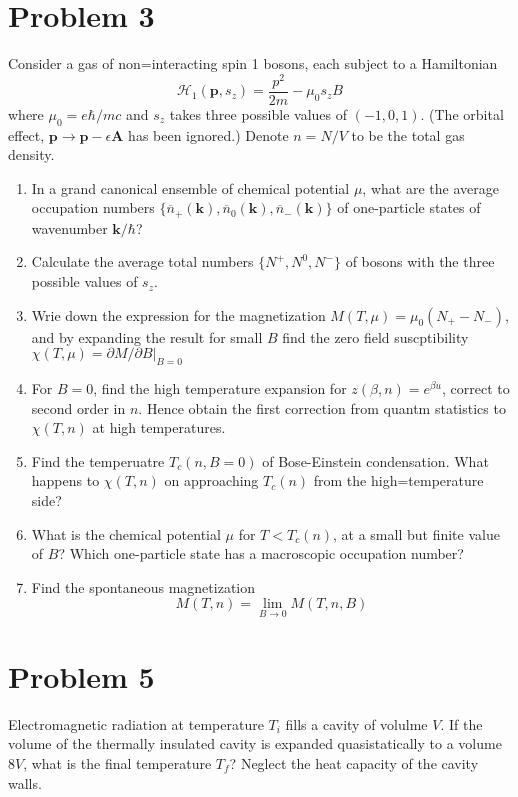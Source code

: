 \documentclass[10pt]{article}
\begin{document}
	\section*{Problem 3}
	Consider a gas of non=interacting spin 1 bosons, each subject to a Hamiltonian 
	\[
	\mathcal H_1(\mathbf p, s_z) = \frac{p^2}{2m} - \mu_0 s_z B 
	\] 
	where \( \mu_0 = e\hbar / mc \) and \( s_z \) takes three possible values of \( (-1, 0, 1) \). (The orbital 
	effect, \( \mathbf p \to \mathbf p - \epsilon \mathbf A \) has been ignored.) Denote \( n = N / V \) to 
	be the total gas density. 
	\begin{enumerate}[label=\alph*)]
		\item In a grand canonical ensemble of chemical potential \( \mu \), what are the average occupation 
			numbers \( \{\overline n_+(\mathbf k), \overline n_0(\mathbf k), \overline n_-(\mathbf k)\}  \) 
			of one-particle states of wavenumber \( \mathbf k / \hbar \)?
		\item Calculate the average total numbers \( \{N^+, N^0, N^{-}\}  \) of bosons with the three possible 
			values of \( s_z \). 
		\item Wrie down the expression for the magnetization \( M(T, \mu) = \mu_0(N_+ - N_-) \), and by expanding
			the result for small \( B \) find the zero field suscptibility \( \chi(T, \mu) = \partial M / 
			\partial B \vert_{B = 0}\)
		\item For \( B = 0 \), find the high temperature expansion for \( z(\beta, n) = e^{\beta u} \), correct
			to second order in \( n \). Hence obtain the first correction from quantm statistics to 
			\( \chi(T, n)  \) at high temperatures. 
		\item Find the temperuatre \( T_c(n, B= 0) \) of Bose-Einstein condensation. What happens to 
			 \( \chi(T, n) \) on approaching \( T_c(n) \) from the high=temperature side?
		 \item What is the chemical potential \( \mu \) for \( T < T_c(n) \), at a small but finite value of
			 \( B \)? Which one-particle state has a macroscopic occupation number?
		 \item Find the spontaneous magnetization 
			 \[
				 M(T, n) = \lim_{B \to 0} M(T, n, B)
			 \] 
	\end{enumerate}
	\pagebreak
	\section*{Problem 5}
	Electromagnetic radiation at temperature \( T_i \) fills a cavity of volulme \( V \). If the volume of the 
	thermally insulated cavity is expanded quasistatically to a volume \( 8V \), what is the final temperature 
	\( T_f \)? Neglect the heat capacity of the cavity walls.
	\pagebreak
\end{document}
